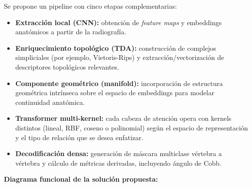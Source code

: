 \documentclass[8pt,a4paper]{article}
\begin{document}
\begin{enumerate}[leftmargin=0.8cm,label=\arabic*.,itemsep=0.85em]
    Se propone un pipeline con cinco etapas complementarias:
    \begin{itemize}[leftmargin=0.6cm,itemsep=0.25em]
        \item \textbf{Extracción local (CNN):} obtención de \textit{feature maps} y embeddings anatómicos a partir de la radiografía.
        \item \textbf{Enriquecimiento topológico (TDA):} construcción de complejos simpliciales (por ejemplo, Vietoris-Rips) y extracción/vectorización de descriptores topológicos relevantes.
        \item \textbf{Componente geométrico (manifold):} incorporación de estructura geométrica intrínseca sobre el espacio de embeddings para modelar continuidad anatómica.
        \item \textbf{Transformer multi-kernel:} cada cabeza de atención opera con kernels distintos (lineal, RBF, coseno o polinomial) según el espacio de representación y el tipo de relación que se desea enfatizar.
        \item \textbf{Decodificación densa:} generación de máscara multiclase vértebra a vértebra y cálculo de métricas derivadas, incluyendo ángulo de Cobb.
    \end{itemize}

    \textbf{Diagrama funcional de la solución propuesta:}

    \begingroup
\shorthandoff{<>}
\begin{center}
\end{center}
\end{enumerate}
\end{document}
